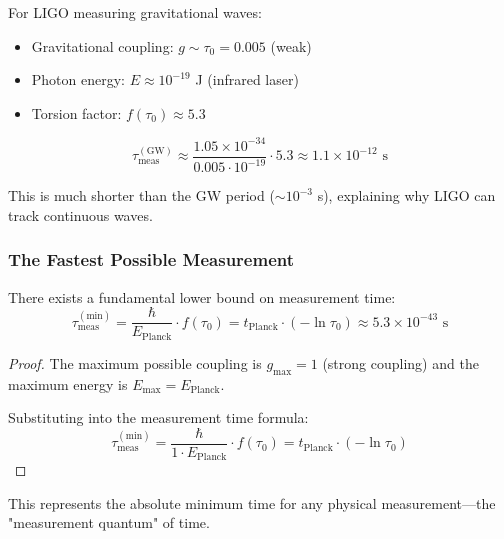 \begin{example}
For LIGO measuring gravitational waves:
\begin{itemize}
    \item Gravitational coupling: $g \sim \tau_0 = 0.005$ (weak)
    \item Photon energy: $E \approx 10^{-19}$ J (infrared laser)
    \item Torsion factor: $f(\tau_0) \approx 5.3$
\end{itemize}

\begin{equation}
    \tau_{\text{meas}}^{(\text{GW})} \approx \frac{1.05 \times 10^{-34}}{0.005 \cdot 10^{-19}} \cdot 5.3 \approx 1.1 \times 10^{-12} \text{ s}
\end{equation}

This is much shorter than the GW period ($\sim 10^{-3}$ s), explaining why LIGO can track continuous waves.
\end{example}

\subsubsection{The Fastest Possible Measurement}

\begin{theorem}
There exists a fundamental lower bound on measurement time:
\begin{equation}
    \tau_{\text{meas}}^{(\text{min})} = \frac{\hbar}{E_{\text{Planck}}} \cdot f(\tau_0) = t_{\text{Planck}} \cdot (-\ln \tau_0) \approx 5.3 \times 10^{-43} \text{ s}
\end{equation}
\end{theorem}

\begin{proof}
The maximum possible coupling is $g_{\text{max}} = 1$ (strong coupling) and the maximum energy is $E_{\text{max}} = E_{\text{Planck}}$.

Substituting into the measurement time formula:
\begin{equation}
    \tau_{\text{meas}}^{(\text{min})} = \frac{\hbar}{1 \cdot E_{\text{Planck}}} \cdot f(\tau_0) = t_{\text{Planck}} \cdot (-\ln \tau_0)
\end{equation}
\end{proof}

This represents the absolute minimum time for any physical measurement—the "measurement quantum" of time.

